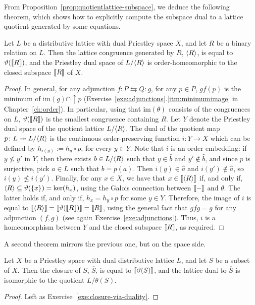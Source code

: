 From Proposition~\ref{prop:quotientlattice-subspace}, we deduce the following theorem, which shows how to explicitly compute the subspace dual to a lattice quotient generated by some equations.
\begin{theorem}
Let $L$ be a distributive lattice with dual Priestley space $X$, and let $R$ be a binary relation on $L$. Then the lattice congruence generated by $R$, $\langle R \rangle$, is equal to $\vartheta(\llbracket {R} \rrbracket)$, and the Priestley dual space of $L/\langle R \rangle$ is order-homeomorphic to the closed subspace $\llbracket {R} \rrbracket$ of $X$.
\end{theorem}
\begin{proof}
In general, for any adjunction $f \colon P \leftrightarrows Q \colon g$, for any $p \in P$, $gf(p)$ is the minimum of $\mathrm{im}(g) \cap {\uparrow}p$ (Exercise~\ref{exe:adjunctions}.\ref{itm:minimumimage} in Chapter~\ref{ch:order}). In particular, using that $\mathrm{im}(\theta)$ consists of the congruences on $L$, $\vartheta(\llbracket {R} \rrbracket)$ is the smallest congruence containing $R$. Let $Y$ denote the Priestley dual space of the quotient lattice $L / \langle R \rangle$. The dual of the quotient map $p \colon L \twoheadrightarrow L / \langle R \rangle$ is the continuous order-preserving function $i \colon Y \to X$ which can be defined by $h_{i(y)} := h_y \circ p$, for every $y \in Y$. Note that $i$ is an order embedding: if $y \nleq y'$ in $Y$, then there exists $b \in L / \langle R \rangle$ such that $y \in \widehat{b}$ and $y' \not\in \widehat{b}$, and since $p$ is surjective, pick $a \in L$ such that $b = p(a)$. Then $i(y) \in \widehat{a}$ and $i(y') \not\in \widehat{a}$, so $i(y) \nleq i(y')$. Finally, for any $x \in X$, we have that $x \in \llbracket {\langle R \rangle} \rrbracket$ if, and only if, $\langle R \rangle \subseteq \vartheta(\{x\}) = \ker(h_x)$, using the Galois connection between $\llbracket {-} \rrbracket$ and $\theta$. The latter holds if, and only if, $h_x = h_y \circ p$ for some $y \in Y$. Therefore, the image of $i$ is equal to $\llbracket {\langle R \rangle} \rrbracket = \llbracket {\vartheta(\llbracket {R} \rrbracket)} \rrbracket = \llbracket {R} \rrbracket$, using the general fact that $gfg = g$ for any adjunction $(f,g)$ (see again Exercise~\ref{exe:adjunctions}). Thus, $i$ is a homeomorphism between $Y$ and the closed subspace $\llbracket {R} \rrbracket$, as required.
\end{proof}

A second theorem mirrors the previous one, but on the space side.
\begin{theorem}\label{thm:closure-via-duality}
Let $X$ be a Priestley space with dual distributive lattice $L$, and let $S$ be a subset of $X$. Then the closure of $S$, $\overline{S}$, is equal to $\llbracket {\vartheta(S)} \rrbracket$, and the lattice dual to $\overline{S}$ is isomorphic to the quotient $L/\theta(S)$.
\end{theorem}
\begin{proof}
Left as Exercise~\ref{exe:closure-via-duality}.
\end{proof}

